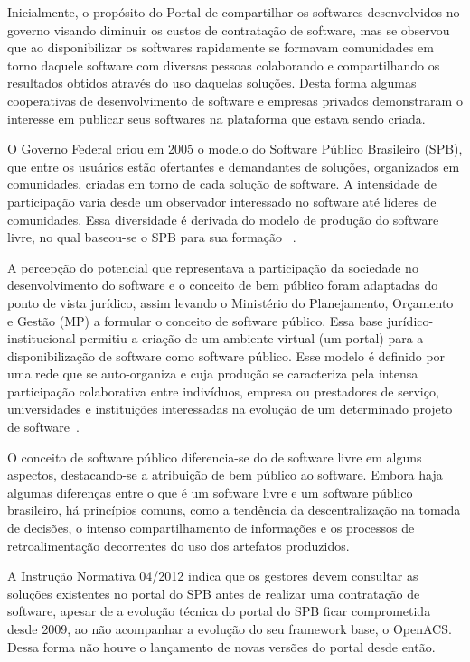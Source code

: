 Inicialmente, o propósito do Portal de compartilhar os softwares desenvolvidos
no governo visando diminuir os custos de contratação de software, mas se observou
que ao disponibilizar os softwares rapidamente se formavam comunidades em torno 
daquele software com diversas pessoas colaborando e compartilhando os resultados
obtidos através do uso daquelas soluções. Desta forma algumas cooperativas de 
desenvolvimento de software e empresas privados demonstraram o interesse em
publicar seus softwares na plataforma que estava sendo criada.

O Governo Federal criou em 2005 o modelo do Software
Público Brasileiro (SPB), que entre os usuários estão ofertantes e demandantes de soluções, 
organizados em comunidades, criadas em torno de cada solução de software. A intensidade de participação
varia desde um observador interessado no software até líderes de comunidades. Essa diversidade é
derivada do modelo de produção do software livre, no qual baseou-se o SPB para sua formação
~\cite{alves2009software}. 

A percepção do potencial que representava a participação da sociedade no desenvolvimento do software
e o conceito de bem público foram adaptadas do ponto de vista jurídico, assim levando o Ministério
do Planejamento, Orçamento e Gestão (MP) a formular o conceito de software público. Essa base
jurídico-institucional permitiu a criação de um ambiente virtual (um portal) para a disponibilização
de software como software público. Esse modelo é definido por uma rede que se auto-organiza e cuja
produção se caracteriza pela intensa participação colaborativa entre indivíduos, empresa ou 
prestadores de serviço, universidades e instituições interessadas na evolução de um determinado projeto
de software~\cite{alves2009software}.

O conceito de software público diferencia-se do de software livre em alguns aspectos, destacando-se
a atribuição de bem público ao software. Embora haja algumas diferenças entre o que é um software
livre e um software público brasileiro, há princípios comuns, como a tendência da descentralização na
tomada de decisões, o intenso compartilhamento de informações e os processos de retroalimentação
decorrentes do uso dos artefatos produzidos. 

A Instrução Normativa 04/2012 indica que os gestores devem consultar as soluções 
existentes no portal do SPB antes de realizar uma contratação de software, apesar de
a evolução técnica do portal do SPB ficar comprometida desde 2009, ao não acompanhar 
a evolução do seu framework base, o OpenACS. Dessa forma não houve o lançamento de novas versões do
portal desde então\cite{softwarepublico}.


